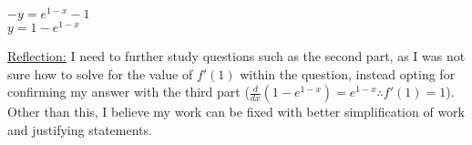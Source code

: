 \documentclass[10pt,letterpaper]{report}
\begin{document}
\begin{enumerate}
\begin{enumerate}
      $-y = e^{1-x}-1$ \\
      
      $y=1-e^{1-x}$ \\
      
  \end{enumerate}
  
  \underline{Reflection:} I need to further study questions such as the second part, as I was not sure how to solve for the value of $f'(1)$ within the question, instead opting for confirming my answer with the third part ($\frac{d}{dx}(1-e^{1-x}) = e^{1-x}\therefore f'(1) = 1$). Other than this, I believe my work can be fixed with better simplification of work and justifying statements. 
\end{enumerate}
\end{document}

